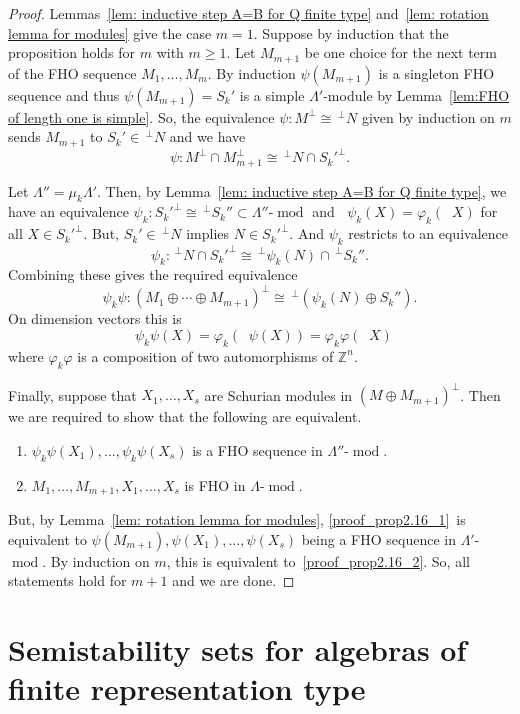 \documentclass[ALCO,ThmDefs,Unicode,epreuves]{cedram}
\DeclareMathOperator{\undim}{\underline{dim}}
\DeclareMathOperator{\modr}{mod}
\newcommand{\field}[1]{\mathbb{#1}}
\newcommand{\ZZ}{\ensuremath{{\field{Z}}}}
\begin{document}
\begin{proof}
Lemmas~\ref{lem: inductive step A=B for Q finite type} and~\ref{lem: rotation lemma for modules} give the case $m=1$. Suppose by induction that the proposition holds for $m$ with $m\ge1$. Let $M_{m+1}$ be one choice for the next term of the FHO sequence $M_1,\ldots,M_m$. By induction $\psi(M_{m+1})$ is a singleton FHO sequence and thus $\psi(M_{m+1})=S_k'$ is a simple $\Lambda'$-module by Lemma~\ref{lem:FHO of length one is simple}. So, the equivalence $\psi:M^\perp \cong \,^{\perp}N$ given by induction on $m$ sends $M_{m+1}$ to $S_k'\in \,^\perp N$ and we have
\[
	\psi:M^\perp \cap M_{m+1}^\perp\cong \,^{\perp}N\cap S_k'^{\perp}.
\]


Let $\Lambda''=\mu_k\Lambda'$. Then, by Lemma~\ref{lem: inductive step A=B for Q finite type}, we have an equivalence $\psi_k:S_k'^{\perp}\cong \,^{\perp}S_k''\subset \Lambda''$-$\modr$ and $\undim \psi_k(X)=\varphi_k(\undim X)$ for all $X\in S_k'^{\perp}$. But, $S_k'\in\,^{\perp}N$ implies $N\in S_k'^{\perp}$. And $\psi_k$ restricts to an equivalence
\[
	\psi_k: \,^{\perp}N\cap S_k'^{\perp}\cong \,^{\perp}\psi_k(N)\cap \,^{\perp}S_k''.
\]
Combining these gives the required equivalence
\[
	\psi_k\psi:(M_1\oplus\cdots \oplus M_{m+1})^\perp\cong \,^{\perp}(\psi_k(N)\oplus S_k'').
\]
On dimension vectors this is
\[
	\undim \psi_k\psi (X)=\varphi_k(\undim \psi (X))=\varphi_k\varphi(\undim X)
\]
where $\varphi_k\varphi$ is a composition of two automorphisms of $\ZZ^n$.

Finally, suppose that $X_1,\ldots,X_s$ are Schurian modules in $(M\oplus M_{m+1})^\perp$. Then we are required to show that the following are equivalent.
\begin{enumerate}
\item\label{proof_prop2.16_1} $\psi_k\psi(X_1),\ldots,\psi_k\psi(X_s)$ is a FHO sequence in $\Lambda''$-$\modr$.
\item\label{proof_prop2.16_2} $M_1,\ldots,M_{m+1},X_1,\ldots,X_s$ is FHO in $\Lambda$-$\modr$.
\end{enumerate}
But, by Lemma~\ref{lem: rotation lemma for modules}, \eqref{proof_prop2.16_1}~is equivalent to $\psi(M_{m+1}),\psi(X_1),\ldots,\psi(X_s)$ being a FHO sequence in $\Lambda'$-$\modr$. By induction on $m$, this is equivalent to~\eqref{proof_prop2.16_2}. So, all statements hold for $m+1$ and we are done.
\end{proof}


\section{Semistability sets for algebras of finite representation type}\label{Sect3}
\end{document}
